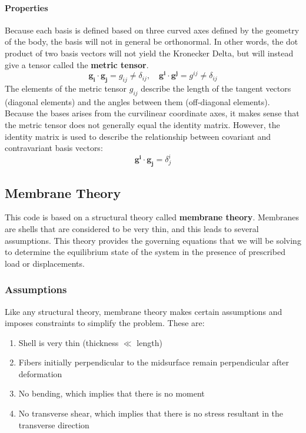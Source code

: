 \documentclass[]{spie}  %
\begin{document}
\paragraph{Properties}
Because each basis is defined based on three curved axes defined by the geometry of the body, the basis will not in general be orthonormal. In other words, the dot product of two basis vectors will not yield the Kronecker Delta, but will instead give a tensor called the \textbf{metric tensor}.
\begin{equation}
\bm{g_i} \cdot \bm{g_j} = g_{ij} \neq \delta_{ij}, \quad \bm{g^i} \cdot \bm{g^j} = g^{ij} \neq \delta_{ij}
\end{equation}
The elements of the metric tensor $g_{ij}$ describe the length of the tangent vectors (diagonal elements) and the angles between them (off-diagonal elements). Because the bases arises from the curvilinear coordinate axes, it makes sense that the metric tensor does not generally equal the identity matrix. However, the identity matrix is used to describe the relationship between covariant and contravariant basis vectors:
\begin{equation}
\bm{g^i} \cdot \bm{g_j} = \delta^i_j
\end{equation}


\subsection{Membrane Theory}
This code is based on a structural theory called \textbf{membrane theory}. Membranes are shells that are considered to be very thin, and this leads to several assumptions. This theory provides the governing equations that we will be solving to determine the equilibrium state of the system in the presence of prescribed load or displacements. 

\subsubsection{Assumptions}
Like any structural theory, membrane theory makes certain assumptions and imposes constraints to simplify the problem. These are:
\begin{enumerate}
	\item Shell is very thin (thickness $\ll$ length)
	\item Fibers initially perpendicular to the midsurface remain perpendicular after deformation
	\item No bending, which implies that there is no moment
	\item No transverse shear, which implies that there is no stress resultant in the transverse direction
\end{enumerate}
\end{document}
